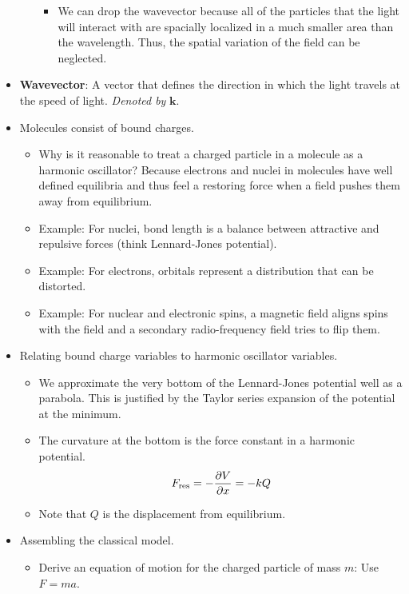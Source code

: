 \documentclass[../notes.tex]{subfiles}
\begin{document}
\begin{itemize}
\begin{itemize}
\begin{itemize}
            \item We can drop the wavevector because all of the particles that the light will interact with are spacially localized in a much smaller area than the wavelength. Thus, the spatial variation of the field can be neglected.
        \end{itemize}
    \end{itemize}
    \item \textbf{Wavevector}: A vector that defines the direction in which the light travels at the speed of light. \emph{Denoted by} $\bm{k}$.
    \item Molecules consist of bound charges.
    \begin{itemize}
        \item Why is it reasonable to treat a charged particle in a molecule as a harmonic oscillator? Because electrons and nuclei in molecules have well defined equilibria and thus feel a restoring force when a field pushes them away from equilibrium.
        \item Example: For nuclei, bond length is a balance between attractive and repulsive forces (think Lennard-Jones potential).
        \item Example: For electrons, orbitals represent a distribution that can be distorted.
        \item Example: For nuclear and electronic spins, a magnetic field aligns spins with the field and a secondary radio-frequency field tries to flip them.
    \end{itemize}
    \item Relating bound charge variables to harmonic oscillator variables.
    \begin{itemize}
        \item We approximate the very bottom of the Lennard-Jones potential well as a parabola. This is justified by the Taylor series expansion of the potential at the minimum.
        \item The curvature at the bottom is the force constant in a harmonic potential.
        \begin{equation*}
            F_\text{res} = -\pdv{V}{x} = -kQ
        \end{equation*}
        \item Note that $Q$ is the displacement from equilibrium.
    \end{itemize}
    \item Assembling the classical model.
    \begin{itemize}
        \item Derive an equation of motion for the charged particle of mass $m$: Use $F=ma$.

\end{itemize}
\end{itemize}
\end{document}

